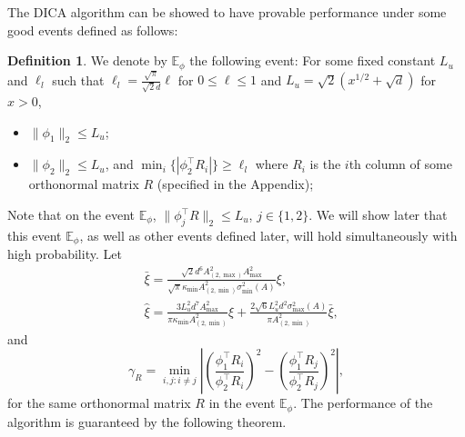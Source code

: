 \documentclass[twoside]{article}
\newcommand{\Ephione}{\mathbb{E}_{\phi_1}}
\newcommand{\Ephitwo}{\mathbb{E}_{\phi_2}}
\newcommand{\Ephi}{\mathbb{E}_{\phi}}
\theoremstyle{definition}
\newtheorem{definition}[lemma]{Definition}
\begin{document}
The DICA algorithm can be showed to have provable performance under some good events defined as follows:
\begin{definition}
We denote by $\Ephi$ the following event:
For some fixed constant $L_u$ and $\ell_l$ such that $\ell_l = \frac{\sqrt{\pi}}{\sqrt{2}d}\ell$ for $0\le \ell\le 1$ and $ L_u = \sqrt{2}\left(x^{1/2}+\sqrt{d}\right)$ for $x>0$,
\begin{itemize}
\item $\|\phi_1\|_2 \le L_u$;
\item $\|\phi_2\|_2 \le L_u$, and $\min_i \{|\phi_2^{\top}R_i|\} \ge \ell_l$ where $R_i$ is the $i$th column of some orthonormal matrix $R$ (specified in the Appendix);
\end{itemize} 
\end{definition}  
Note that on the event $\Ephi$, $\|\phi_j^{\top}R\|_2\le L_u$, $j\in\{1,2\}$. 
We will show later that this event $\Ephi$, as well as other events defined later, will hold simultaneously with high probability.
Let 
\begin{align*}
& \bar{\xi} =   \frac{\sqrt{2}d^6A_{(2,\max)}^2A_{\max}^2}{\sqrt{\pi}\kappa_{\min}A^2_{(2,\min)}\sigma_{\min}^2(A)}\xi, \\
& \widehat{\xi} = \frac{3L_u^2d^7A^2_{\max}}{\pi\kappa_{\min}A^2_{(2,\min)}}\xi + \frac{2\sqrt{6}L_u^2d^2\sigma_{\max}^2(A)}{\pi A^2_{(2,\min)}}\bar{\xi},
\end{align*} 
and 
\begin{equation}
\label{def:gammaR}
\gamma_R =  \min_{i,j: i\neq j} \left\vert \left(\frac{\phi_1^{\top}R_i}{\phi_2^{\top}R_i}\right)^2 - \left(\frac{\phi_1^{\top}R_j}{\phi_2^{\top}R_j}\right)^2 \right\vert, 
\end{equation}
for the same orthonormal matrix $R$ in the event $\Ephi$.
The performance of the algorithm is guaranteed by the following theorem.
\end{document}

